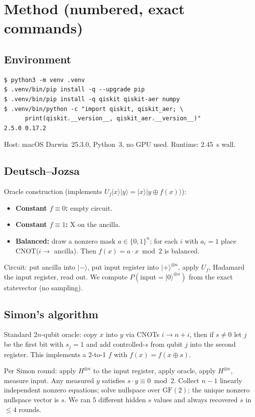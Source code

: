 \documentclass[11pt]{article}
\begin{document}
\section{Method (numbered, exact commands)}

\subsection{Environment}
\begin{lstlisting}
$ python3 -m venv .venv
$ .venv/bin/pip install -q --upgrade pip
$ .venv/bin/pip install -q qiskit qiskit-aer numpy
$ .venv/bin/python -c "import qiskit, qiskit_aer; \
      print(qiskit.__version__, qiskit_aer.__version__)"
2.5.0 0.17.2
\end{lstlisting}

Host: macOS Darwin~25.3.0, Python~3, no GPU used.  Runtime: 2.45~s wall.

\subsection{Deutsch--Jozsa}

Oracle construction (implements $U_f|x\rangle|y\rangle = |x\rangle|y\oplus f(x)\rangle$):
\begin{itemize}
    \item \textbf{Constant $f\equiv 0$:} empty circuit.
    \item \textbf{Constant $f\equiv 1$:} X on the ancilla.
    \item \textbf{Balanced:} draw a nonzero mask $a\in\{0,1\}^n$; for each $i$ with $a_i=1$ place CNOT($i \to$ ancilla).  Then $f(x)=a\cdot x \bmod 2$ is balanced.
\end{itemize}
Circuit: put ancilla into $|-\rangle$, put input register into $|+\rangle^{\otimes n}$, apply $U_f$, Hadamard the input register, read out.  We compute $P(\text{input}=|0\rangle^{\otimes n})$ from the exact statevector (no sampling).

\subsection{Simon's algorithm}

Standard 2$n$-qubit oracle: copy $x$ into $y$ via CNOTs $i\to n+i$, then if $s\ne 0$ let $j$ be the first bit with $s_j=1$ and add controlled-$s$ from qubit $j$ into the second register.  This implements a 2-to-1 $f$ with $f(x)=f(x\oplus s)$.

Per Simon round: apply $H^{\otimes n}$ to the input register, apply oracle, apply $H^{\otimes n}$, measure input.  Any measured $y$ satisfies $s\cdot y \equiv 0 \bmod 2$.  Collect $n{-}1$ linearly independent nonzero equations; solve nullspace over $\mathrm{GF}(2)$; the unique nonzero nullspace vector is $s$.  We ran 5 different hidden $s$ values and always recovered $s$ in $\le 4$ rounds.
\end{document}
